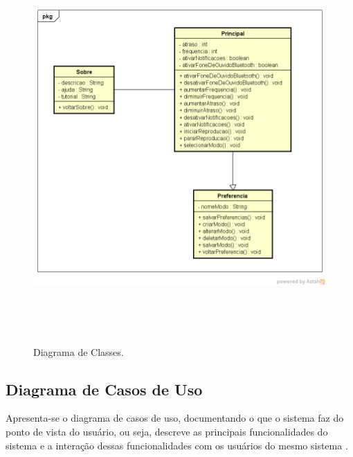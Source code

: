 \begin{figure}[H]
	\centering
	\caption[Diagrama de Classes]{Diagrama de Classes. \label{fig:diagramadeclasses}}
	\includegraphics[height=15cm]{./Figuras/class_diagram.png}%
\end{figure}

\subsection{Diagrama de Casos de Uso}

Apresenta-se o diagrama de casos de uso, documentando o que o sistema faz do ponto de vista do usu\'ario, ou seja, descreve as principais funcionalidades do sistema e a intera\c{c}\~ao dessas funcionalidades com os usu\'arios do mesmo sistema \cite{Ribeiro2012}.

